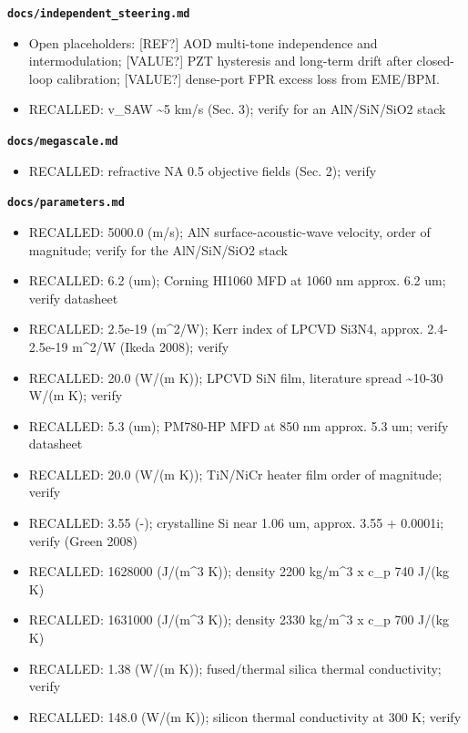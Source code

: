 \textbf{\texttt{docs/independent\_\allowbreak{}steering.md}}

\begin{itemize}
\tightlist
\item
  Open placeholders: {[}REF?{]} AOD multi-tone independence and
  intermodulation; {[}VALUE?{]} PZT hysteresis and long-term drift after
  closed-loop calibration; {[}VALUE?{]} dense-port FPR excess loss from
  EME/BPM.
\item
  RECALLED: v\_\allowbreak{}SAW \textasciitilde5 km/s (Sec. 3); verify for an
  AlN/SiN/SiO2 stack
\end{itemize}

\textbf{\texttt{docs/megascale.md}}

\begin{itemize}
\tightlist
\item
  RECALLED: refractive NA 0.5 objective fields (Sec. 2); verify
\end{itemize}

\textbf{\texttt{docs/parameters.md}}

\begin{itemize}
\tightlist
\item
  RECALLED: 5000.0 (m/s); AlN surface-acoustic-wave velocity, order of
  magnitude; verify for the AlN/SiN/SiO2 stack
\item
  RECALLED: 6.2 (um); Corning HI1060 MFD at 1060 nm approx. 6.2 um;
  verify datasheet
\item
  RECALLED: 2.5e-19 (m\^{}2/W); Kerr index of LPCVD Si3N4, approx.
  2.4-2.5e-19 m\^{}2/W (Ikeda 2008); verify
\item
  RECALLED: 20.0 (W/(m K)); LPCVD SiN film, literature spread
  \textasciitilde10-30 W/(m K); verify
\item
  RECALLED: 5.3 (um); PM780-HP MFD at 850 nm approx. 5.3 um; verify
  datasheet
\item
  RECALLED: 20.0 (W/(m K)); TiN/NiCr heater film order of magnitude;
  verify
\item
  RECALLED: 3.55 (-); crystalline Si near 1.06 um, approx. 3.55 +
  0.0001i; verify (Green 2008)
\item
  RECALLED: 1628000 (J/(m\^{}3 K)); density 2200 kg/m\^{}3 x c\_\allowbreak{}p 740
  J/(kg K)
\item
  RECALLED: 1631000 (J/(m\^{}3 K)); density 2330 kg/m\^{}3 x c\_\allowbreak{}p 700
  J/(kg K)
\item
  RECALLED: 1.38 (W/(m K)); fused/thermal silica thermal conductivity;
  verify
\item
  RECALLED: 148.0 (W/(m K)); silicon thermal conductivity at 300 K;
  verify
\end{itemize}

